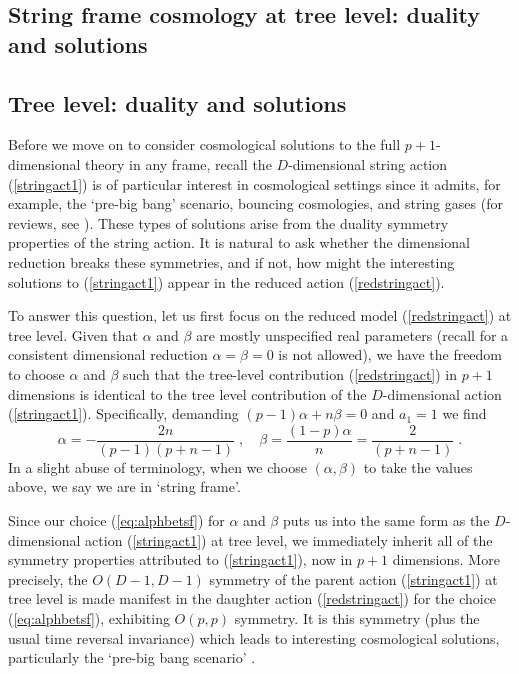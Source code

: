 \documentclass[amsmath,amssymb,11pt]{article}
\newcommand{\beq}{\begin{equation}}
\newcommand{\eeq}{\end{equation}}
\begin{document}
\subsection{String frame cosmology at tree level: duality and solutions} \label{sec:SFcosmo}

\subsection*{Tree level: duality and solutions}

Before we move on to consider cosmological solutions to the full $p+1$-dimensional theory in any frame, recall the $D$-dimensional string action (\ref{stringact1}) is of particular  interest in cosmological settings since it admits, for example, the `pre-big bang' scenario, bouncing cosmologies, and string gases (for reviews, see \cite{Veneziano:2000pz,Gasperini:2002bn,Gasperini07-1}). These types of solutions arise from the duality symmetry properties of the string action. It is natural to ask whether the dimensional reduction  breaks these symmetries, and if not, how might the interesting solutions to (\ref{stringact1}) appear in the reduced action (\ref{redstringact}). 

To answer this question, let us first focus on the reduced model (\ref{redstringact}) at tree level. Given that $\alpha$ and $\beta$ are mostly unspecified real parameters (recall for a consistent dimensional reduction $\alpha=\beta=0$ is not allowed), we have the freedom to choose $\alpha$ and $\beta$ such that the tree-level contribution (\ref{redstringact}) in $p+1$ dimensions is identical to the tree level contribution of the $D$-dimensional action (\ref{stringact1}). Specifically, demanding $(p-1)\alpha+n\beta=0$ and $a_{1}=1$ we find
\beq \alpha=-\frac{2n}{(p-1)(p+n-1)}\;,\quad \beta=\frac{(1-p)\alpha}{n}=\frac{2}{(p+n-1)}\;.\label{eq:alphbetsf}\eeq
In a slight abuse of terminology, when we choose $(\alpha,\beta)$ to take the values above, we say we are in `string frame'.


Since our choice (\ref{eq:alphbetsf}) for $\alpha$ and $\beta$ puts us into the same form as the $D$-dimensional action (\ref{stringact1}) at tree level, we immediately inherit all of the symmetry properties attributed to (\ref{stringact1}), now in $p+1$ dimensions. More precisely, the $O(D-1,D-1)$ symmetry of the parent action (\ref{stringact1}) at tree level is made manifest in the daughter action (\ref{redstringact}) for the choice (\ref{eq:alphbetsf}), exhibiting $O(p,p)$ symmetry. It is this symmetry (plus the usual time reversal invariance) which leads to interesting cosmological solutions, particularly the `pre-big bang scenario' \cite{Gasperini:1992em}. 
\end{document}
